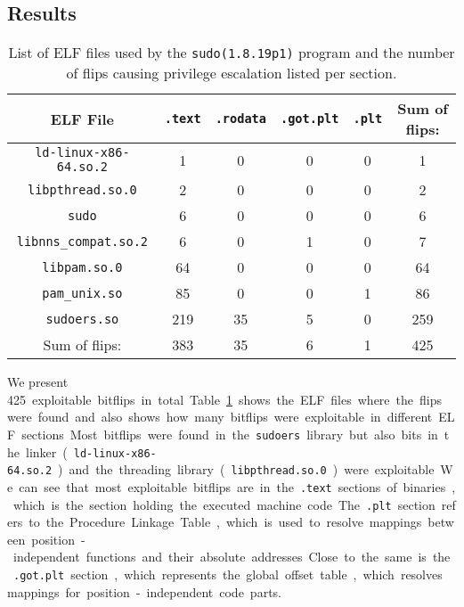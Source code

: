 \subsection{Results}

\begin{table}[!htb]
\centering
\begin{tabular}{c|cccc|c}
ELF File & \texttt{.text}  & \texttt{.rodata} & \texttt{.got.plt} &
\texttt{.plt} & Sum of flips:                             \\ \hline
\texttt{ld-linux-x86-64.so.2} & 1   & 0  & 0  & 0  & 1    \\
\texttt{libpthread.so.0}      & 2   & 0  & 0  & 0  & 2    \\
\texttt{sudo}                 & 6   & 0  & 0  & 0  & 6    \\
\texttt{libnns\_compat.so.2}  & 6   & 0  & 1  & 0  & 7    \\
\texttt{libpam.so.0}          & 64  & 0  & 0  & 0  & 64   \\
\texttt{pam\_unix.so}         & 85  & 0  & 0  & 1  & 86   \\
\texttt{sudoers.so}           & 219 & 35 & 5  & 0  & 259  \\ \hline
Sum of flips:                 & 383 & 35 & 6  & 1  & 425
\end{tabular}
\caption{List of ELF files used by the \texttt{sudo(1.8.19p1)} program and the
number of flips causing privilege escalation listed per section.}
\label{tab:sudores}
\end{table}

We present \SI{425} exploitable bitflips in total. Table~\ref{tab:sudores} shows
the ELF files where the flips were found and also shows how many bitflips were
exploitable in different ELF sections.  Most bitflips were found in the
\texttt{sudoers} library but also bits in the linker
(\texttt{ld-linux-x86-64.so.2}) and the threading library
(\texttt{libpthread.so.0}) were exploitable.

We can see that most exploitable bitflips are in the \texttt{.text} sections of
binaries, which is the section holding the executed machine code. The
\texttt{.plt} section refers to the Procedure Linkage Table, which is used to
resolve mappings between position-independent functions and their absolute
addresses. Close to the same is the \texttt{.got.plt} section, which represents
the global offset table, which resolves mappings for position-independent code
parts.

